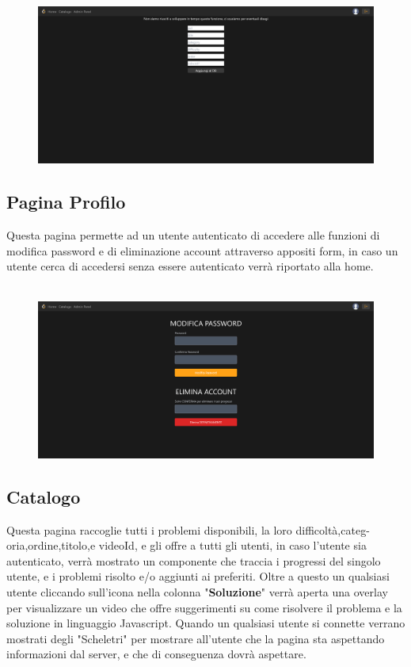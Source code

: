 \documentclass[11pt, a4paper]{article}
\theoremstyle{definition}
\begin{document}
\begin{figure}[H]
  \centering
  \includegraphics[width=\textwidth]{materiale/sito/Pannello Admin.png}
\end{figure}

\subsection{Pagina Profilo}
Questa pagina permette ad un utente autenticato di accedere alle funzioni di modifica password e di eliminazione account attraverso appositi form, in caso un utente cerca di accedersi senza essere autenticato verrà riportato alla home.\\\\

\begin{figure}[H]
  \centering
  \includegraphics[width=\textwidth]{materiale/sito/Pagina Profilo.png}
\end{figure}

\subsection{Catalogo}
Questa pagina raccoglie tutti i problemi disponibili, la loro difficoltà,categ-\\
oria,ordine,titolo,e videoId, e gli offre a tutti gli utenti, in caso l'utente sia autenticato, verrà mostrato un componente
 che traccia i progressi del singolo utente, e i problemi risolto e/o aggiunti ai preferiti. Oltre a questo un qualsiasi
utente cliccando sull'icona nella colonna "\textbf{Soluzione}" verrà aperta una overlay per visualizzare un video che offre suggerimenti su come risolvere il problema e la soluzione in linguaggio Javascript.
Quando un qualsiasi utente si connette verrano mostrati degli "Scheletri" per mostrare all'utente che la pagina sta aspettando informazioni dal server, e che di conseguenza dovrà aspettare.\\\\
\end{document}
